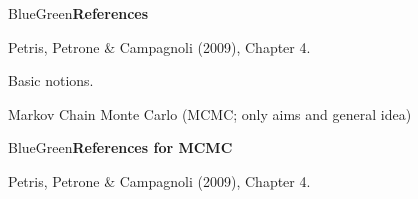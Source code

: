 \documentclass[dvipsnames,12pt]{book}
\begin{document}
        \begin{mybox}{BlueGreen}{\textbf{References}}

            Petris, Petrone \& Campagnoli (2009), Chapter 4.
            
        \end{mybox}

        Basic notions.
    
        Markov Chain Monte Carlo (MCMC; only aims and general idea)

        \begin{mybox}{BlueGreen}{\textbf{References for MCMC}}

            Petris, Petrone \& Campagnoli (2009), Chapter 4.
            
        \end{mybox}
\end{document}

